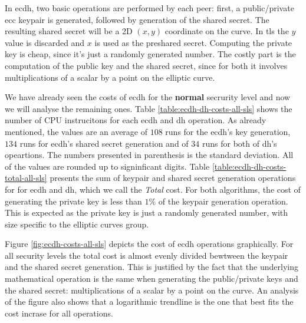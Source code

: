 \documentclass{llncs}
\begin{document}
In \gls{ecdh}, two basic operations are performed by each peer: first, a public/private \gls{ecc} keypair is generated, followed by generation of
the shared secret. The resulting shared secret will be a 2D $(x,y)$ coordinate on the curve. In \gls{tls} the $y$ value is discarded and $x$ is
used as the preshared secret. Computing the private key is cheap, since it's just a randomly generated number. The costly part is the computation of
the public key and the shared secret, since for both it involves multiplications of a scalar by a point on the elliptic curve.

We have already seen the costs of \gls{ecdh} for the \textbf{normal} secrurity level and now we will analyse the remaining ones. Table
\ref{table:ecdh-dh-costs-all-sls} shows the number of CPU instrucitons for each \gls{ecdh} and \gls{dh} operation. As already mentioned, the values are 
an average of $108$ runs for the \gls{ecdh}'s key generation, $134$ runs for \gls{ecdh}'s shared secret generation and of $34$ runs for both of \gls{dh}'s
opeartions. The numbers presented in parenthesis is the standard deviation. All of the values are rounded up to signinficant digits.
Table \ref{table:ecdh-dh-costs-total-all-sls} presents the sum of keypair and shared secret generation operations for for \gls{ecdh} and \gls{dh},
which we call the \textit{Total} cost. For both algorithms, the cost of generating the private key is less than $1\%$ of the keypair generation operation.
This is expected as the private key is just a randomly generated number, with size specific to the elliptic curves group.

Figure \ref{fig:ecdh-costs-all-sls} depicts the cost of \gls{ecdh} operations graphically. For all security levels the total cost is almost
evenly divided bewtween the keypair and the shared secret generation. This is justified by the fact that the underlying mathematical operation is
the same when generating the public/private keys and the shared secret: multiplications of a scalar by a point on the curve. An analysis of the figure
also shows that a logarithmic trendline is the one that best fits the cost incrase for all operations.
\end{document}
